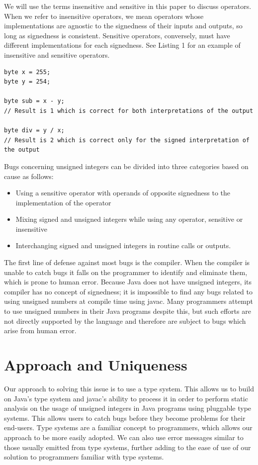 \documentclass{sig-alternate-05-2015}
\begin{document}
We will use the terms insensitive and sensitive in this paper to discuss operators. When we refer to insensitive operators, we mean operators whose implementations are agnostic to the signedness of their inputs and outputs, so long as signedness is consistent. Sensitive operators, conversely, must have different implementations for each signedness. See Listing 1 for an example of insensitive and sensitive operators.

\begin{lstlisting}[caption=Example depicting subtraction\texttt{,} a sound operator\texttt{,} and division\texttt{,} an unsound operator.]
byte x = 255;
byte y = 254;

byte sub = x - y;
// Result is 1 which is correct for both interpretations of the output

byte div = y / x;
// Result is 2 which is correct only for the signed interpretation of the output
\end{lstlisting}

Bugs concerning unsigned integers can be divided into three categories based on cause as follows:

\begin{itemize}
  \item Using a sensitive operator with operands of opposite signedness to the implementation of the operator
  \item Mixing signed and unsigned integers while using any operator, sensitive or insensitive
  \item Interchanging signed and unsigned integers in routine calls or outputs.
\end{itemize}

The first line of defense against most bugs is the compiler. When the compiler is unable to catch bugs it falls on the programmer to identify and eliminate them, which is prone to human error. Because Java does not have unsigned integers, its compiler has no concept of signedness; it is impossible to find any bugs related to using unsigned numbers at compile time using javac. Many programmers attempt to use unsigned numbers in their Java programs despite this, but such efforts are not directly supported by the language and therefore are subject to bugs which arise from human error.

\section{Approach and Uniqueness}

Our approach to solving this issue is to use a type system. This allows us to build on Java's type system and javac's ability to process it in order to perform static analysis on the usage of unsigned integers in Java programs using pluggable type systems. This allows users to catch bugs before they become problems for their end-users. Type systems are a familiar concept to programmers, which allows our approach to be more easily adopted. We can also use error messages similar to those usually emitted from type systems, further adding to the ease of use of our solution to programmers familiar with type systems.
\end{document}
